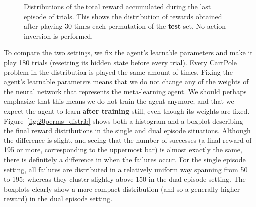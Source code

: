 \begin{figure}[H]
	\centering
	\caption{Distributions of the total reward accumulated during the last
	episode of trials. This shows the distribution of rewards obtained
	after playing 30 times each permutation of the \textbf{test} set. No action
	inversion is performed.}
	\label{fig:20perms_unseen_distrib}
\end{figure}

To compare the two settings, we fix the agent's learnable parameters and make
it play 180 trials (resetting its hidden state before every trial). Every 
CartPole problem in the distribution is played the same amount of times.
Fixing the agent's learnable parameters means that we do not change
any of the weights of the neural network that represents the meta-learning
agent. We should perhaps emphasize that this means we do not train the agent
anymore; and that we expect the agent to learn \textbf{after training} still,
even though its weights are fixed.\\

Figure~\ref{fig:20perms_distrib} shows both a histogram and a boxplot describing
the final reward distributions in the single and dual episode situations. 
Although the difference is slight, and seeing that the number
of successes (a final reward of 195 or more, corresponding to the uppermost
bar) is almost exactly the same, there is definitely a difference in when the
failures occur. For the single episode setting, all failures are distributed
in a relatively uniform way spanning from 50 to 195; whereas they cluster 
slightly above 150 in the dual episode setting. The boxplots clearly show
a more compact distribution (and so a generally higher reward) in the dual
episode setting.\\


